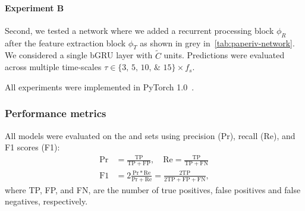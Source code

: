 \paragraph{Experiment B} Second, we tested a network where we added a recurrent processing block $\phi_{R}$ after the feature extraction block $\phi_{T}$ as shown in grey in~\cref{tab:paperiv-network}. 
We considered a single \ac{bGRU} layer with $\tilde{C}$ units. 
Predictions were evaluated across multiple time-scales $\tau \in \lbrace \numlist[list-final-separator={, }]{3;5;10;15} \rbrace \times f_{s}$.

All experiments were implemented in PyTorch 1.0~\cite{Paszke2017,Paszke2019}.

\subsubsection{Performance metrics}
All models were evaluated on the \eval and \test sets using precision (Pr), recall (Re), and F1 scores (F1):
\begin{align}
    \mathrm{Pr} &= \frac{\mathrm{TP}}{\mathrm{TP} + \mathrm{FP}}, \quad \mathrm{Re} = \frac{\mathrm{TP}}{\mathrm{TP} + \mathrm{FN}} \\
    \mathrm{F1} &= 2 \frac{\mathrm{Pr} * \mathrm{Re}}{\mathrm{Pr} + \mathrm{Re}} = \frac{2\mathrm{TP}}{2\mathrm{TP} + \mathrm{FP} + \mathrm{FN}},
\end{align}
where TP, FP, and FN, are the number of true positives, false positives and false negatives, respectively.


